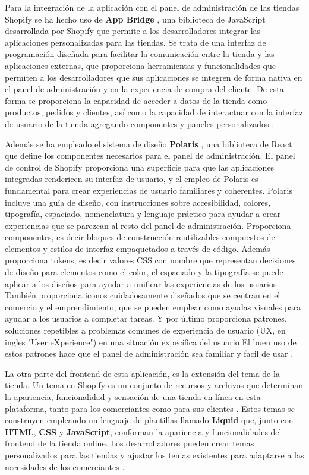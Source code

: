\documentclass[12pt]{article}
\begin{document}
Para la integración de la aplicación con el panel de administración de las tiendas Shopify se ha hecho uso de \textbf{App Bridge} \cite{app-bridge}, una biblioteca de JavaScript
desarrollada por Shopify que permite a los desarrolladores integrar las aplicaciones personalizadas para las tiendas. Se trata de una interfaz
de programación diseñada para facilitar la comunicación entre la tienda y las aplicaciones externas, que proporciona herramientas y funcionalidades
que permiten a los desarrolladores que sus aplicaciones se integren de forma nativa en el panel de administración y en la experiencia de compra
del cliente. De esta forma se proporciona la capacidad de acceder a datos de la tienda como productos, pedidos y clientes, así como la capacidad de interactuar con la interfaz
de usuario de la tienda agregando componentes y paneles personalizados \cite{shopify-dev}. 

Además se ha empleado el sistema de diseño \textbf{Polaris} \cite{polaris}, una biblioteca de React que define los componentes necesarios para el panel de administración.
El panel de control de Shopify proporciona una superficie para que las aplicaciones integradas rendericen su interfaz de usuario, y el empleo de Polaris
es fundamental para crear experiencias de usuario familiares y coherentes.
Polaris incluye una guía de diseño, con instrucciones sobre accesibilidad, colores, tipografía, espaciado, nomenclatura y lenguaje práctico para ayudar 
a crear experiencias que se parezcan al resto del panel de administración. Proporciona componentes, es decir bloques de construcción reutilizables compuestos de 
elementos y estilos de interfaz empaquetados a través de código. Además proporciona tokens, es decir valores CSS con nombre que representan decisiones
de diseño para elementos como el color, el espaciado y la tipografía se puede aplicar a los diseños para ayudar a unificar las experiencias de los usuarios.
También proporciona iconos cuidadosamente diseñados que se centran en el comercio y el emprendimiento, que se pueden emplear como ayudas visuales para ayudar a los 
usuarios a completar tareas. Y por último proporciona patrones, soluciones repetibles a problemas comunes de experiencia de usuario (UX, en ingles "User eXperience") en una situación expecífica del usuario
El buen uso de estos patrones hace que el panel de administración sea familiar y facil de usar \cite{shopify-dev}.

La otra parte del frontend de esta aplicación, es la extensión del tema de la tienda. Un tema en Shopify es un conjunto de recursos
y archivos que determinan la apariencia, funcionalidad y sensación de una tienda en línea en esta plataforma, tanto para los comerciantes como para
sus clientes \cite{theme}. Estos temas se construyen empleando un lenguaje de plantillas llamado \textbf{Liquid} \cite{liquid} que, junto con \textbf{HTML}, \textbf{CSS} y \textbf{JavaScript}, conforman la apariencia
y funcionalidades del frontend de la tienda online. Los desarrolladores pueden crear temas personalizados para las tiendas y ajustar los temas existentes 
para adaptarse a las necesidades de los comerciantes \cite{shopify-dev}. 
\end{document}
